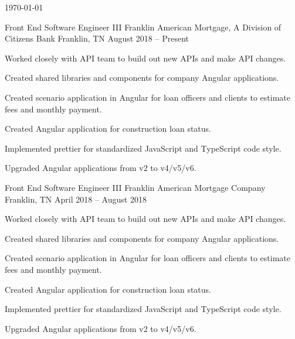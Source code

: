 \documentclass[letterpaper]{awesome-cv}
\begin{document}
\makecvfooter
{\today}
{}
{\thepage}

\makecvheader[C]

\begin{cventries}
  \cventry
    {Front End Software Engineer III}
    {Franklin American Mortgage, A Division of Citizens Bank}
    {Franklin, TN}
    {August 2018 – Present}
    {\begin{cvitems}
      \item {Worked closely with API team to build out new APIs and make API changes.}
      \item {Created shared libraries and components for company Angular applications.}
      \item {Created scenario application in Angular for loan officers and clients to estimate fees and monthly payment.}
      \item {Created Angular application for construction loan status.}
      \item {Implemented prettier for standardized JavaScript and TypeScript code style.}
      \item {Upgraded Angular applications from v2 to v4/v5/v6.}
      \end{cvitems}}

  \cventry
    {Front End Software Engineer III}
    {Franklin American Mortgage Company}
    {Franklin, TN}
    {April 2018 – August 2018}
    {\begin{cvitems}
      \item {Worked closely with API team to build out new APIs and make API changes.}
      \item {Created shared libraries and components for company Angular applications.}
      \item {Created scenario application in Angular for loan officers and clients to estimate fees and monthly payment.}
      \item {Created Angular application for construction loan status.}
      \item {Implemented prettier for standardized JavaScript and TypeScript code style.}
      \item {Upgraded Angular applications from v2 to v4/v5/v6.}
      \end{cvitems}}


\end{cventries}
\end{document}
